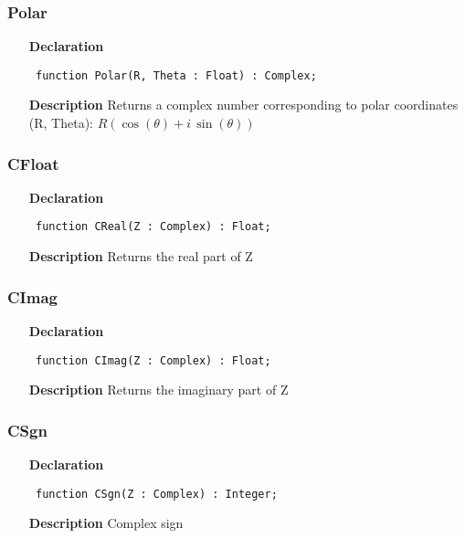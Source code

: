 \documentclass[12pt,a4paper,oneside]{report}
\newcommand{\declarationitem}[1]{\textbf{#1}}
\newcommand{\descriptiontitle}[1]{\textbf{#1}}
\newcommand{\code}[1]{\texttt{#1}}
\begin{document}
\subsubsection{Polar}
\label{ucomplex-Polar}
\begin{itemize}\item[\declarationitem{Declaration}\hfill]
\begin{flushleft}
\code{
function Polar(R, Theta : Float) : Complex;}
\end{flushleft}
\item[\descriptiontitle{Description}]
Returns a complex number corresponding to polar coordinates (R, Theta):
$R(\cos(\theta)+i\,\sin(\theta))$
\end{itemize}
\subsubsection{CFloat}
\label{ucomplex-CFloat}
\begin{itemize}\item[\declarationitem{Declaration}\hfill]
\begin{flushleft}
\code{
function CReal(Z : Complex) : Float;}

\end{flushleft}

\par
\item[\descriptiontitle{Description}]
Returns the real part of Z

\end{itemize}
\subsubsection{CImag}
\label{ucomplex-CImag}
\begin{itemize}\item[\declarationitem{Declaration}\hfill]
\begin{flushleft}
\code{
function CImag(Z : Complex) : Float;}

\end{flushleft}

\par
\item[\descriptiontitle{Description}]
Returns the imaginary part of Z

\end{itemize}
\subsubsection{CSgn}
\label{ucomplex-CSgn}
\begin{itemize}\item[\declarationitem{Declaration}\hfill]
\begin{flushleft}
\code{
function CSgn(Z : Complex) : Integer;}

\end{flushleft}

\par
\item[\descriptiontitle{Description}]
Complex sign

\end{itemize}
\end{document}
